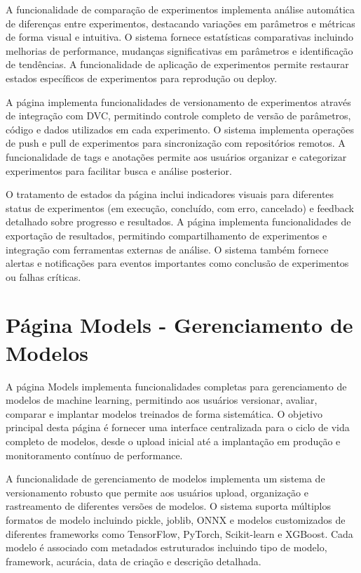 \documentclass[12pt,a4paper]{article}
\begin{document}
A funcionalidade de comparação de experimentos implementa análise automática de diferenças entre experimentos, destacando variações em parâmetros e métricas de forma visual e intuitiva. O sistema fornece estatísticas comparativas incluindo melhorias de performance, mudanças significativas em parâmetros e identificação de tendências. A funcionalidade de aplicação de experimentos permite restaurar estados específicos de experimentos para reprodução ou deploy.

A página implementa funcionalidades de versionamento de experimentos através de integração com DVC, permitindo controle completo de versão de parâmetros, código e dados utilizados em cada experimento. O sistema implementa operações de push e pull de experimentos para sincronização com repositórios remotos. A funcionalidade de tags e anotações permite aos usuários organizar e categorizar experimentos para facilitar busca e análise posterior.

O tratamento de estados da página inclui indicadores visuais para diferentes status de experimentos (em execução, concluído, com erro, cancelado) e feedback detalhado sobre progresso e resultados. A página implementa funcionalidades de exportação de resultados, permitindo compartilhamento de experimentos e integração com ferramentas externas de análise. O sistema também fornece alertas e notificações para eventos importantes como conclusão de experimentos ou falhas críticas.

\section{Página Models - Gerenciamento de Modelos}

A página Models implementa funcionalidades completas para gerenciamento de modelos de machine learning, permitindo aos usuários versionar, avaliar, comparar e implantar modelos treinados de forma sistemática. O objetivo principal desta página é fornecer uma interface centralizada para o ciclo de vida completo de modelos, desde o upload inicial até a implantação em produção e monitoramento contínuo de performance.

A funcionalidade de gerenciamento de modelos implementa um sistema de versionamento robusto que permite aos usuários upload, organização e rastreamento de diferentes versões de modelos. O sistema suporta múltiplos formatos de modelo incluindo pickle, joblib, ONNX e modelos customizados de diferentes frameworks como TensorFlow, PyTorch, Scikit-learn e XGBoost. Cada modelo é associado com metadados estruturados incluindo tipo de modelo, framework, acurácia, data de criação e descrição detalhada.
\end{document}
